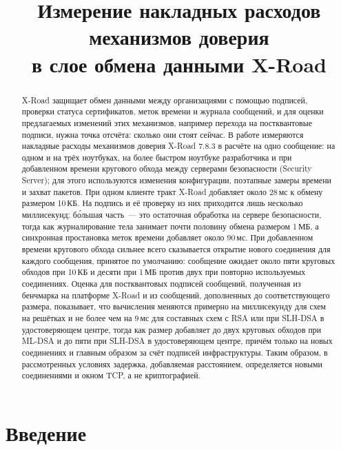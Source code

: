 \documentclass[conference,a4paper]{IEEEtran}
\title{Измерение накладных расходов\\механизмов доверия\\в слое обмена данными X-Road}
\author{\IEEEauthorblockN{Ruslan Nechshadimov}}
\newcommand{\newtext}[1]{{\color{blue}#1}}
\newcommand{\newred}[1]{{\color{red}#1}}
\newcommand{\newgreen}[1]{{\color{green!50!black}#1}}
\begin{document}
\maketitle
\thispagestyle{plain}
\pagestyle{plain}

\begin{abstract}
\newtext{X-Road защищает обмен данными между организациями с помощью подписей, проверки статуса
сертификатов, меток времени и журнала сообщений, и для оценки предлагаемых изменений этих механизмов,
например перехода на постквантовые подписи, нужна точка отсчёта: сколько они стоят сейчас. В работе
измеряются накладные расходы механизмов доверия X-Road 7.8.3 в расчёте на одно сообщение: на одном и
на трёх ноутбуках\newgreen{, на более быстром ноутбуке разработчика} и при добавленном времени
кругового обхода между серверами безопасности (Security Server); для этого используются изменения
конфигурации, поэтапные замеры времени и захват пакетов. При одном клиенте тракт X-Road
добавляет около 28\,мс к обмену размером 10\,КБ. На подпись и её проверку из них приходится лишь
несколько миллисекунд; б\'{о}льшая часть~--- это \newred{остаточная обработка} на сервере безопасности,
тогда как журналирование тела занимает почти половину обмена размером 1\,МБ, а синхронная простановка
меток времени добавляет около 90\,мс. При добавленном времени кругового обхода сильнее всего
сказывается открытие нового соединения для каждого сообщения, принятое по умолчанию: сообщение ожидает
около пяти круговых обходов при 10\,КБ и десяти при 1\,МБ против двух при повторно используемых
соединениях.} \newred{Оценка для постквантовых подписей сообщений, полученная из бенчмарка на
платформе X-Road и из сообщений, дополненных до соответствующего размера, показывает, что вычисления
меняются примерно на миллисекунду \newgreen{для схем на решётках и не более чем на 9\,мс для
составных схем с RSA или при SLH-DSA в удостоверяющем центре}, тогда как размер добавляет до
двух круговых обходов при ML-DSA и до пяти при SLH-DSA в удостоверяющем центре, причём только на новых
соединениях и главным образом за счёт подписей инфраструктуры. Таким образом, в рассмотренных
условиях задержка, добавляемая расстоянием, определяется новыми соединениями и окном TCP, а не
криптографией.}
\end{abstract}

\section{Введение}
\end{document}
